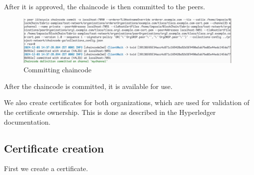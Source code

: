 \documentclass[12pt]{article}
\begin{document}
After it is approved, the chaincode is then committed to the peers.

\begin{figure}[H]
    \centering
    \includegraphics[width=\textwidth]{imgs/commiting_chaincode.PNG}
    \caption{Committing chaincode}
    \label{fig:commitingchaincode}
\end{figure}

After the chaincode is committed, it is available for use.

We also create certificates for both organizations, which are used for validation of the certificate ownership. This is done as described in the Hyperledger documentation.

\subsection{Certificate creation}

First we create a certificate.
\end{document}

